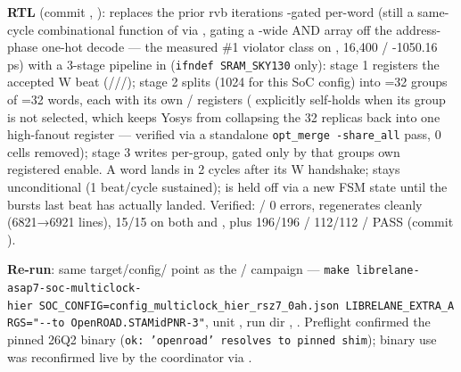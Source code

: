 \begin{record}

\textbf{RTL} (commit , ):
replaces the prior rvb iteration\textquotesingle s
-gated per-word  (still a same-cycle
combinational function of  via , gating a
-wide AND array off the address-phase one-hot decode ---
the measured \#1 violator class on ,
16,400 / -1050.16 ps) with a 3-stage pipeline in
(\texttt{ifndef\ SRAM\_\allowbreak{}SKY130} only): stage 1 registers the
accepted W beat
(///);
stage 2 splits  (1024 for this SoC config) into
=32 groups of =32 words, each with its
own / registers (
explicitly self-holds when its group is not selected, which keeps Yosys
 from collapsing the 32 replicas back into one
high-fanout register --- verified via a standalone
\texttt{opt\_\allowbreak{}merge\ -\allowbreak{}share\_\allowbreak{}all}
pass, 0 cells removed); stage 3 writes  per-group, gated
only by that group\textquotesingle s own registered enable. A word lands
in  2 cycles after its W handshake;  stays
unconditional (1 beat/\allowbreak{}cycle sustained);  is
held off via a new  FSM state until the
burst\textquotesingle s last beat has actually landed. Verified:
/ 0 errors, 
regenerates cleanly (6821→6921 lines), 
 15/15 on both  and
, plus  196/196 /
 112/112 /  PASS (commit
).

\textbf{Re-run}: same target/\allowbreak{}config/ point as
the / campaign ---
\texttt{make\ librelane-\allowbreak{}asap7-\allowbreak{}soc-\allowbreak{}multiclock-\allowbreak{}hier\ SOC\_\allowbreak{}CONFIG=\allowbreak{}config\_\allowbreak{}multiclock\_\allowbreak{}hier\_\allowbreak{}rsz7\_\allowbreak{}0ah.\allowbreak{}json\ LIBRELANE\_\allowbreak{}EXTRA\_\allowbreak{}ARGS=\allowbreak{}"-\allowbreak{}-\allowbreak{}to\ OpenROAD.\allowbreak{}STAMidPNR-\allowbreak{}3"},
unit , run dir
, .
Preflight confirmed the pinned 26Q2 binary
(\texttt{ok:\allowbreak{}\ 'openroad'\ resolves\ to\ pinned\ shim});
binary use was reconfirmed live by the coordinator via
.


\end{record}
